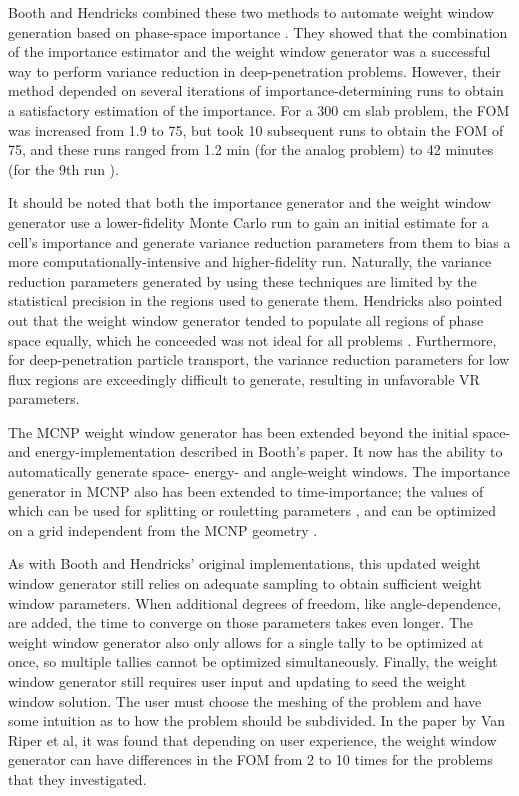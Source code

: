 Booth and Hendricks combined these two methods to
automate weight window generation based on phase-space importance
\cite{booth_deep_1982, booth_importance_1984}. They showed that the combination
of the importance estimator and the weight window generator was a successful way
to perform variance reduction in deep-penetration problems. However, their
method depended on several iterations of importance-determining runs to obtain a
satisfactory estimation of the importance. For a 300 cm slab problem, the FOM was
increased from 1.9 to 75, but took 10 subsequent runs to obtain the FOM of 75,
and these runs ranged from 1.2 min (for the analog problem) to 42 minutes (for
the 9th run \cite{booth_importance_1984}).

It should be noted that both the importance generator and the weight window
generator use a lower-fidelity
Monte Carlo run to gain an initial estimate for a cell's importance and generate
variance reduction parameters from them to bias a more computationally-intensive
and higher-fidelity
run. Naturally, the variance reduction parameters generated by using these
techniques are limited by the statistical precision in the regions used to
generate them. Hendricks also pointed out that the weight window generator
tended to populate all regions of phase space equally, which he conceeded was
not ideal for all problems \cite{hendricks_code-generated_1982}.
Furthermore, for deep-penetration particle transport, the
variance reduction parameters for low flux regions are exceedingly difficult to
generate, resulting in unfavorable VR parameters.

The MCNP \cite{mcnp_manual_v1, brown_mcnp_2002} weight window generator has been
extended beyond the initial space- and energy-implementation described in
Booth's paper. It now has the ability to automatically generate space- energy-
and angle-weight windows. The importance generator in MCNP also has been
extended to time-importance; the values of which can be used for splitting or
rouletting parameters \cite{brown_mcnp_2002}, and can be optimized on a grid
independent from the MCNP geometry \cite{evans_enhanced_1998}.

As with Booth and Hendricks'
original implementations, this updated weight window generator still relies on
adequate sampling to obtain sufficient weight window parameters. When additional
degrees of freedom, like angle-dependence, are added, the time
to converge on those parameters takes even longer. The weight window
generator also only allows for a single tally to be optimized at once, so
multiple tallies cannot be optimized simultaneously. Finally, the weight window
generator still requires user input and updating to seed the weight
window solution. The user must choose the meshing of the problem and have some
intuition as to how the problem should be subdivided. In the paper by Van Riper
et al, it was found that depending on user
experience, the weight window generator can have differences in the FOM from 2
to 10 times \cite{van_riper_generation_1995} for the problems that they
investigated.

